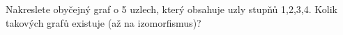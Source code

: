 \subsubsection{}
Nakreslete obyčejný graf o 5 uzlech, který obsahuje uzly stupňů 1,2,3,4. Kolik
takových grafů existuje (až na izomorfismus)?
